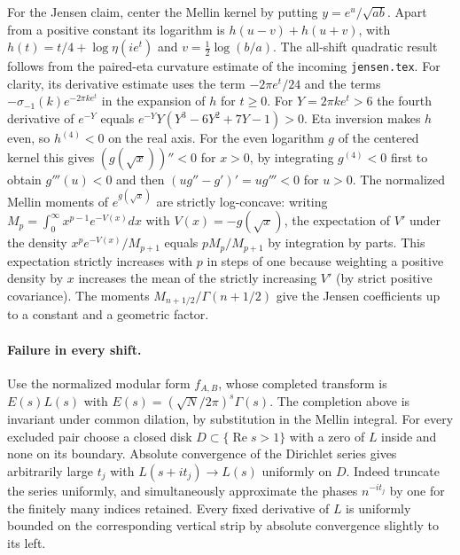 For the Jensen claim, center the Mellin kernel by putting $y=e^u/\sqrt{ab}$.
Apart from a positive constant its logarithm is
$h(u-v)+h(u+v)$, with
$h(t)=t/4+\log\eta(ie^t)$ and $v=\tfrac12\log(b/a)$.
The all-shift quadratic result follows from the paired-eta curvature estimate
of the incoming \texttt{jensen.tex}. For clarity, its derivative estimate uses
the term $-2\pi e^t/24$ and the terms
$-\sigma_{-1}(k)e^{-2\pi k e^t}$ in the expansion of $h$ for $t\ge0$.
For $Y=2\pi k e^t>6$ the fourth derivative of $e^{-Y}$ equals
$e^{-Y}Y(Y^3-6Y^2+7Y-1)>0$.
Eta inversion makes $h$ even, so $h^{(4)}<0$ on the real axis.
For the even logarithm $g$ of the centered kernel this gives
$(g(\sqrt{x}))''<0$ for $x>0$, by integrating $g^{(4)}<0$ first
to obtain $g'''(u)<0$ and then $(ug''-g')'=ug'''<0$ for $u>0$.
The normalized Mellin moments of $e^{g(\sqrt{x})}$ are strictly
log-concave: writing $M_p=\int_0^\infty x^{p-1}e^{-V(x)}dx$ with
$V(x)=-g(\sqrt{x})$, the expectation of $V'$ under the density
$x^p e^{-V(x)}/M_{p+1}$ equals $pM_p/M_{p+1}$ by integration
by parts. This expectation strictly increases with $p$ in steps of one
because weighting a positive density by $x$ increases the mean of the
strictly increasing $V'$ (by strict positive covariance).
The moments $M_{n+1/2}/\Gamma(n+1/2)$ give the Jensen coefficients
up to a constant and a geometric factor.

\paragraph{Failure in every shift.}
Use the normalized modular form $f_{A,B}$, whose completed transform is
$E(s)L(s)$ with $E(s)=(\sqrt{N}/2\pi)^s\Gamma(s)$. The completion above
is invariant under common dilation, by substitution in the Mellin integral.
For every excluded pair choose a closed disk $D\subset\{\operatorname{Re}s>1\}$
with a zero of $L$ inside and none on its boundary. Absolute convergence of
the Dirichlet series gives arbitrarily large $t_j$ with
$L(s+it_j)\to L(s)$ uniformly on $D$. Indeed truncate the series uniformly,
and simultaneously approximate the phases $n^{-it_j}$ by one for the
finitely many indices retained. Every fixed derivative of $L$ is uniformly
bounded on the corresponding vertical strip by absolute convergence slightly
to its left.

